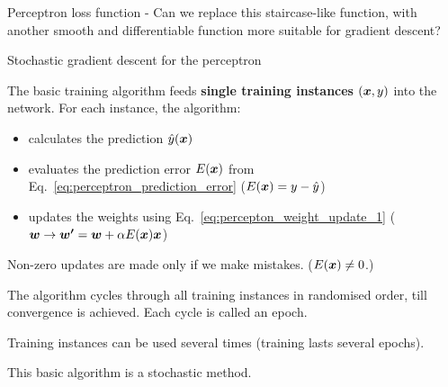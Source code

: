 \begin{frame}[t,allowframebreaks]{Perceptron loss function -}
    Can we replace this staircase-like function, 
    with another smooth and differentiable function 
    more suitable for \gls{gradient descent}?\\
    \vspace{0.3cm}


\end{frame}

%
%
%

\begin{frame}[t]{Stochastic gradient descent for the perceptron}

    The basic training algorithm feeds 
    {\bf single training instances} $(\boldsymbol{x},y)$ into the network.
    For each instance, the algorithm:
    \begin{itemize}
        \item calculates the prediction $\hat{y}(\boldsymbol{x})$ 
        \item evaluates the prediction error $E(\boldsymbol{x})$ 
        from Eq.~\ref{eq:perceptron_prediction_error}
        ($E(\boldsymbol{x}) = y - \hat{y}$)
        \item updates the weights 
        using Eq.~\ref{eq:percepton_weight_update_1} 
        ($\boldsymbol{w} \rightarrow \boldsymbol{w^\prime} = \boldsymbol{w} + \alpha E(\boldsymbol{x}) \boldsymbol{x}$)
    \end{itemize}

    Non-zero updates are made only if we make mistakes. ($E(\boldsymbol{x}) \ne 0$.)\\
    \vspace{0.3cm}

    The algorithm cycles through all training instances in randomised order, 
    till convergence is achieved. 
    Each cycle is called an \gls{epoch}.\\
    \vspace{0.3cm}
    
    Training instances can be used several times (training lasts several epochs).\\ 
    \vspace{0.3cm}

    This basic algorithm is a 
    \gls{stochastic} 
     method.\\

\end{frame}


%
%
%

